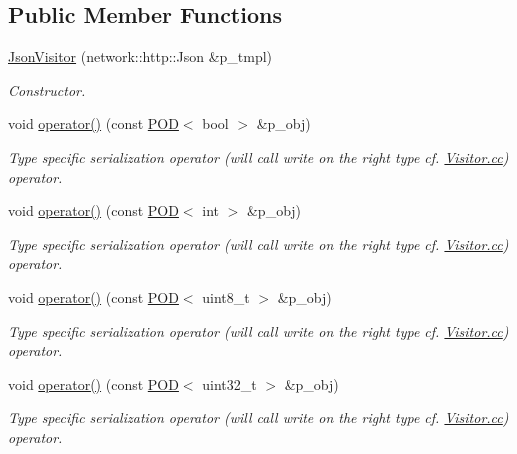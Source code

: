 \subsection*{Public Member Functions}
\begin{DoxyCompactItemize}
\item 
\hyperlink{classxtd_1_1servers_1_1param_1_1JsonVisitor_a87e4c626ded6951d1ee930d25229e8b4}{Json\-Visitor} (network\-::http\-::\-Json \&p\-\_\-tmpl)
\begin{DoxyCompactList}\small\item\em Constructor. \end{DoxyCompactList}\item 
void \hyperlink{classxtd_1_1servers_1_1param_1_1JsonVisitor_a95fa5ae6b560745f24200cec3b4c899a}{operator()} (const \hyperlink{classxtd_1_1servers_1_1param_1_1POD}{P\-O\-D}$<$ bool $>$ \&p\-\_\-obj)
\begin{DoxyCompactList}\small\item\em Type specific serialization operator (will call write on the right type cf. \hyperlink{Visitor_8cc}{Visitor.\-cc}) operator. \end{DoxyCompactList}\item 
void \hyperlink{classxtd_1_1servers_1_1param_1_1JsonVisitor_a1813b3c21a65b66ff441f29d0f51ccc3}{operator()} (const \hyperlink{classxtd_1_1servers_1_1param_1_1POD}{P\-O\-D}$<$ int $>$ \&p\-\_\-obj)
\begin{DoxyCompactList}\small\item\em Type specific serialization operator (will call write on the right type cf. \hyperlink{Visitor_8cc}{Visitor.\-cc}) operator. \end{DoxyCompactList}\item 
void \hyperlink{classxtd_1_1servers_1_1param_1_1JsonVisitor_a1f69e5ceb9d95168d4725d3949636682}{operator()} (const \hyperlink{classxtd_1_1servers_1_1param_1_1POD}{P\-O\-D}$<$ uint8\-\_\-t $>$ \&p\-\_\-obj)
\begin{DoxyCompactList}\small\item\em Type specific serialization operator (will call write on the right type cf. \hyperlink{Visitor_8cc}{Visitor.\-cc}) operator. \end{DoxyCompactList}\item 
void \hyperlink{classxtd_1_1servers_1_1param_1_1JsonVisitor_af7d283dea375905cd4b93497123c4f80}{operator()} (const \hyperlink{classxtd_1_1servers_1_1param_1_1POD}{P\-O\-D}$<$ uint32\-\_\-t $>$ \&p\-\_\-obj)
\begin{DoxyCompactList}\small\item\em Type specific serialization operator (will call write on the right type cf. \hyperlink{Visitor_8cc}{Visitor.\-cc}) operator. \end{DoxyCompactList}\item 

\end{DoxyCompactItemize}
